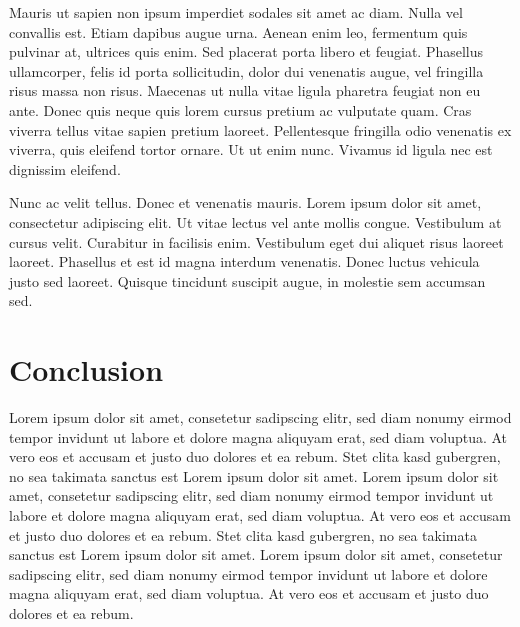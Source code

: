 \documentclass[review,journal]{vgtc}         %
\begin{document}
Mauris ut sapien non ipsum imperdiet sodales sit amet ac diam. Nulla vel convallis est. Etiam dapibus augue urna. Aenean enim leo, fermentum quis pulvinar at, ultrices quis enim. Sed placerat porta libero et feugiat. Phasellus ullamcorper, felis id porta sollicitudin, dolor dui venenatis augue, vel fringilla risus massa non risus. Maecenas ut nulla vitae ligula pharetra feugiat non eu ante. Donec quis neque quis lorem cursus pretium ac vulputate quam. Cras viverra tellus vitae sapien pretium laoreet. Pellentesque fringilla odio venenatis ex viverra, quis eleifend tortor ornare. Ut ut enim nunc. Vivamus id ligula nec est dignissim eleifend.

Nunc ac velit tellus. Donec et venenatis mauris. Lorem ipsum dolor sit amet, consectetur adipiscing elit. Ut vitae lectus vel ante mollis congue. Vestibulum at cursus velit. Curabitur in facilisis enim. Vestibulum eget dui aliquet risus laoreet laoreet. Phasellus et est id magna interdum venenatis. Donec luctus vehicula justo sed laoreet. Quisque tincidunt suscipit augue, in molestie sem accumsan sed.
\section{Conclusion}

Lorem ipsum dolor sit amet, consetetur sadipscing elitr, sed diam
nonumy eirmod tempor invidunt ut labore et dolore magna aliquyam erat,
sed diam voluptua. At vero eos et accusam et justo duo dolores et ea
rebum. Stet clita kasd gubergren, no sea takimata sanctus est Lorem
ipsum dolor sit amet. Lorem ipsum dolor sit amet, consetetur
sadipscing elitr, sed diam nonumy eirmod tempor invidunt ut labore et
dolore magna aliquyam erat, sed diam voluptua. At vero eos et accusam
et justo duo dolores et ea rebum. Stet clita kasd gubergren, no sea
takimata sanctus est Lorem ipsum dolor sit amet. Lorem ipsum dolor sit
amet, consetetur sadipscing elitr, sed diam nonumy eirmod tempor
invidunt ut labore et dolore magna aliquyam erat, sed diam
voluptua. At vero eos et accusam et justo duo dolores et ea
rebum.



%

%
%
%


\end{document}
